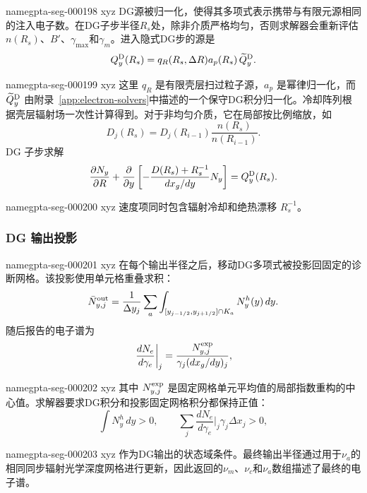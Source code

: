 \documentclass[twocolumn]{aastex702}
\makeatletter
\providecommand{\gptareaderanchor}[1]{\pdfdest name{#1} xyz}%
\providecommand{\gptareaderanchor}[1]{\special{pdf:dest (#1) [ @thispage /XYZ @xpos @ypos null ]}}%
\makeatother
\begin{document}
\gptareaderanchor{gpta-seg-000198}%
DG源被归一化，使得其多项式表示携带与有限元源相同的注入电子数。在DG子步半径\(R_s\)处，除非介质严格均匀，否则求解器会重新评估\(n(R_s)\)、\(B'\)、\(\gamma_{\max}\)和\(\gamma_m\)。进入隐式DG步的源是
\begin{equation}
Q_y^{\rm D}(R_s)=
q_R(R_s,\Delta R)a_p(R_s)\,\widetilde Q_y^{\rm D}.
\end{equation}

\gptareaderanchor{gpta-seg-000199}%
这里 \(q_R\) 是有限壳层扫过粒子源，\(a_p\) 是幂律归一化，而 \(\widetilde Q_y^{\rm D}\) 由附录~\ref{app:electron-solvers}中描述的一个保守DG积分归一化。冷却阵列根据壳层辐射场一次性计算得到。对于非均匀介质，它在局部按比例缩放，如
\begin{equation}
D_j(R_s)=
D_j(R_{i-1})\frac{n(R_s)}{n(R_{i-1})}.
\end{equation}
DG 子步求解
\begin{equation}
\frac{\partial N_y}{\partial R}
+\frac{\partial}{\partial y}
\left[
-\frac{D(R_s)+R_s^{-1}}
{dx_g/dy}N_y
\right]
=Q_y^{\rm D}(R_s).
\end{equation}

\gptareaderanchor{gpta-seg-000200}%
速度项同时包含辐射冷却和绝热漂移 \(R_s^{-1}\)。

\subsubsection{DG 输出投影}


\gptareaderanchor{gpta-seg-000201}%
在每个输出半径之后，移动DG多项式被投影回固定的诊断网格。该投影使用单元格重叠求积：
\begin{equation}
\bar N_{y,j}^{\rm out}=
\frac{1}{\Delta y_j}
\sum_a\int_{[y_{j-1/2},y_{j+1/2}]\cap K_a}
N_y^h(y)\,dy .
\end{equation}
随后报告的电子谱为
\begin{equation}
\left.\frac{dN_e}{d\gamma_e}\right|_j=
\frac{N_{y,j}^{\rm exp}}
{\gamma_j(dx_g/dy)_j},
\end{equation}

\gptareaderanchor{gpta-seg-000202}%
其中 \(N_{y,j}^{\rm exp}\) 是固定网格单元平均值的局部指数重构的中心值。求解器要求DG积分和投影固定网格积分都保持正值：
\begin{equation}
\int N_y^h\,dy>0,\qquad
\sum_j\frac{dN_e}{d\gamma_e}\bigg|_j
\gamma_j\Delta x_j>0,
\end{equation}

\gptareaderanchor{gpta-seg-000203}%
作为DG输出的状态域条件。最终输出半径通过用于\(\nu_a\)的相同同步辐射光学深度网格进行更新，因此返回的\(\nu_m\)、\(\nu_c\)和\(\nu_a\)数组描述了最终的电子谱。
\end{document}
